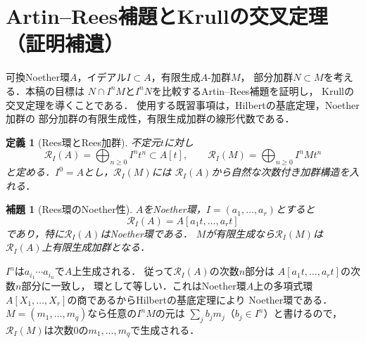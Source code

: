 \documentclass[a5paper,10pt,onecolumn]{jsarticle}
\makeatletter
\theoremstyle{mathnotetheorem}
\newtheorem{definition}[theorem]{定義}
\newtheorem{lemma}[theorem]{補題}
\renewcommand{\proofname}{証明}
\renewenvironment{proof}[1][\proofname]{%
  \par\pushQED{\qed}\normalfont\topsep4\p@\@plus2\p@\relax
  \trivlist\item[\hskip\labelsep\bfseries #1]\ignorespaces
}{\popQED\endtrivlist\@endpefalse}
\makeatother
\begin{document}
\section{Artin--Rees補題とKrullの交叉定理（証明補遺）}
可換Noether環$A$，イデアル$I\subset A$，有限生成$A$-加群$M$，
部分加群$N\subset M$を考える．本稿の目標は
$N\cap I^nM$と$I^nN$を比較するArtin--Rees補題を証明し，
Krullの交叉定理を導くことである．
使用する既習事項は，Hilbertの基底定理，Noether加群の
部分加群の有限生成性，有限生成加群の線形代数である．

\begin{definition}[Rees環とRees加群]
不定元$t$に対し
\[
 \mathcal R_I(A)=\bigoplus_{n\ge0}I^nt^n\subset A[t],
 \qquad
 \mathcal R_I(M)=\bigoplus_{n\ge0}I^nMt^n
\]
と定める．$I^0=A$とし，$\mathcal R_I(M)$には
$\mathcal R_I(A)$から自然な次数付き加群構造を入れる．
\end{definition}

\begin{lemma}[Rees環のNoether性]\label{ar:lem:rees}
$A$をNoether環，$I=(a_1,\ldots,a_r)$とすると
\[
 \mathcal R_I(A)=A[a_1t,\ldots,a_rt]
\]
であり，特に$\mathcal R_I(A)$はNoether環である．
$M$が有限生成なら$\mathcal R_I(M)$は
$\mathcal R_I(A)$上有限生成加群となる．
\end{lemma}
\begin{proof}
$I^n$は$a_{i_1}\cdots a_{i_n}$で$A$上生成される．
従って$\mathcal R_I(A)$の次数$n$部分は
$A[a_1t,\ldots,a_rt]$の次数$n$部分に一致し，
環として等しい．これはNoether環$A$上の多項式環
$A[X_1,\ldots,X_r]$の商であるからHilbertの基底定理により
Noether環である．
$M=(m_1,\ldots,m_q)$なら任意の$I^nM$の元は
$\sum_j b_jm_j$（$b_j\in I^n$）と書けるので，
$\mathcal R_I(M)$は次数0の$m_1,\ldots,m_q$で生成される．
\end{proof}
\end{document}
